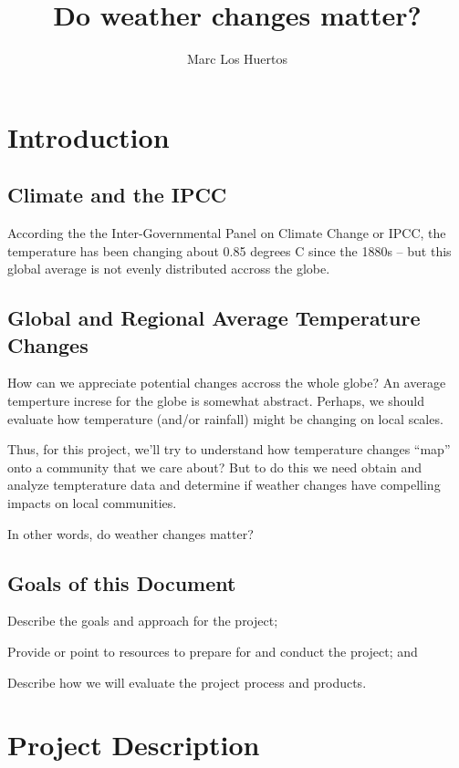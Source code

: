 \documentclass{article}\usepackage[]{graphicx}\usepackage[]{color}
\title{Do weather changes matter?}
\author{Marc Los Huertos}
\newenvironment{enumerate*}%
  {\begin{enumerate}%
    \setlength{\itemsep}{0pt}%
    \setlength{\parskip}{0pt}}%
  {\end{enumerate}}
\begin{document}
\maketitle
\tableofcontents

\section{Introduction}

\subsection{Climate and the IPCC}

According the the Inter-Governmental Panel on Climate Change or IPCC, the temperature has been changing about 0.85 degrees C since the  1880s -- but this global average is not evenly distributed accross the globe. 

\subsection{Global and Regional Average Temperature Changes}

How can we appreciate potential changes accross the whole globe? An average temperture increse for the globe is somewhat abstract. Perhaps, we should evaluate how temperature (and/or rainfall) might be changing on local scales. 

Thus, for this project, we'll try to understand how temperature changes ``map'' onto a community that we care about? But to do this we need obtain and analyze tempterature data and determine if weather changes have compelling impacts on local communities.

In other words, do weather changes matter?

\subsection{Goals of this Document}

\begin{enumerate*}
  \item Describe the goals and approach for the project;
  \item Provide or point to resources to prepare for and conduct the project; and
  \item Describe how we will evaluate the project process and products.
\end{enumerate*}

\section{Project Description}
\end{document}
